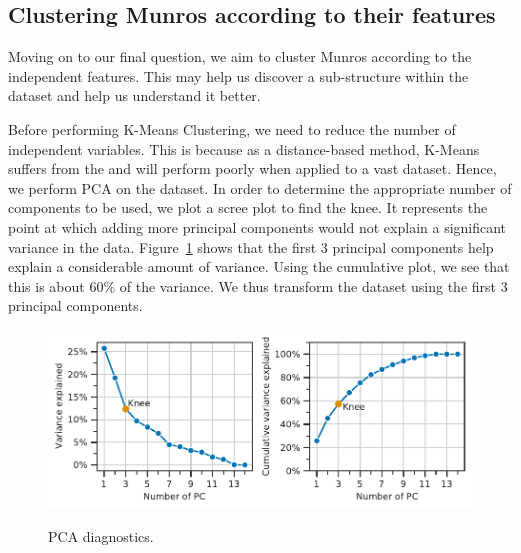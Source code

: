 \documentclass[11pt,a4paper]{article}
\begin{document}
\subsection{Clustering Munros according to their features}
Moving on to our final question, we aim to cluster Munros according to the independent features. This may help us discover a sub-structure within the dataset and help us understand it better.

Before performing K-Means Clustering, we need to reduce the number of independent variables. This is because as a distance-based method, K-Means suffers from the  and will perform poorly when applied to a vast dataset. Hence, we perform PCA on the dataset. In order to determine the appropriate number of components to be used, we plot a scree plot to find the knee. It represents the point at which adding more principal components would not explain a significant variance in the data. Figure~\ref{fds-project-template:fig:scree_plot} shows that the first 3 principal components help explain a considerable amount of variance. Using the cumulative plot, we see that this is about $60\%$ of the variance. We thus transform the dataset using the first 3 principal components.
\begin{figure} [h!]
    \centering
    \includegraphics{report/scree_plot.pdf}
    \begin{minipage}[t]{.5\linewidth}
        \centering
        \label{fds-project-template:fig:scree_plot_def}
    \end{minipage}%
    \begin{minipage}[t]{.5\linewidth}
        \centering
        \label{fds-project-template:fig:scree_plot_cum}
    \end{minipage}
    \caption{PCA diagnostics.}
    \label{fds-project-template:fig:scree_plot}
\end{figure}
\end{document}
